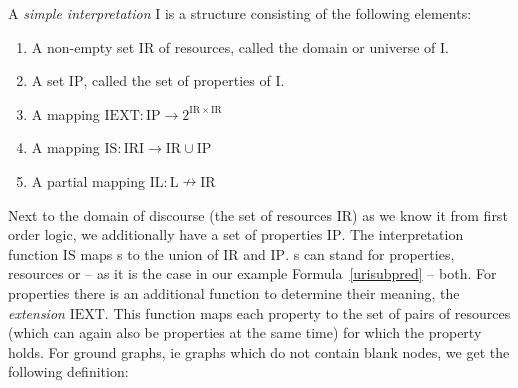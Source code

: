\begin{definition}\label{si}
A \emph{simple interpretation} $\mathrm{I}$ is a structure consisting of the following elements:
\begin{enumerate}
 \item A non-empty set $\mathrm{IR}$ of resources, called the domain or universe of $\mathrm{I}$.
 \item A set $\mathrm{IP}$, called the set of properties of $\mathrm{I}$.
 \item A mapping $\mathrm{IEXT}: \mathrm{IP} \rightarrow 2^{\mathrm{IR}\times \mathrm{IR}}$
 \item A mapping $\mathrm{IS}:\mathrm{IRI}\rightarrow \mathrm{IR}\cup \mathrm{IP}$
 \item A partial mapping $\mathrm{IL}:\mathrm{L} \nrightarrow \mathrm{IR}$
\end{enumerate}
\end{definition}
Next to the domain of discourse (the set of resources $\mathrm{IR}$) as we know it from first order logic,  we additionally have 
a set of properties $\mathrm{IP}$.
The interpretation function $\mathrm{IS}$ maps \iri{}s to the union of $\mathrm{IR}$ and $\mathrm{IP}$. 
\iri{}s can stand for properties, resources or -- as it is the case in our example Formula~\ref{urisubpred} -- both. 
For properties there is an additional function to determine their meaning, the \emph{extension} $\mathrm{IEXT}$. 
This function  maps  each property to the set of pairs of resources (which can again also be properties at the same time) for which the property holds.
% 
% 
For ground graphs, ie graphs which do not contain blank nodes, we get the following definition:

